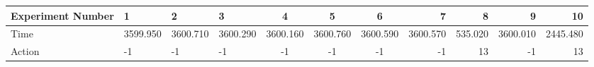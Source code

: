 \documentclass[8pt]{article}
\begin{document}
\begin{landscape}
\begin{tabular}{ | l | l | l | l | c | c | c | r | r | r | r | }
 \hline 
Experiment Number & 1 & 2 & 3 & 4 & 5 & 6 & 7 & 8 & 9 & 10\\ \hline
Time & 3599.950 & 3600.710 & 3600.290 & 3600.160 & 3600.760 & 3600.590 & 3600.570 & 535.020 & 3600.010 & 2445.480\\ \hline
Action & -1 & -1 & -1 & -1 & -1 & -1 & -1 & 13 & -1 & 13\\ \hline\end{tabular}
\end{landscape}
\end{document}
